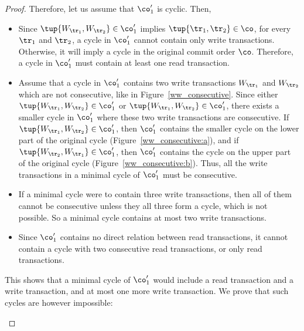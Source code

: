 \begin{proof}
Therefore, let us assume that $\co'_1$ is cyclic. Then,
 \begin{itemize}
  \item Since $\tup{W_{\tr_1}, W_{\tr_2}} \in \co'_1$ implies $\tup{\tr_1, \tr_2} \in \co$, for every $\tr_1$ and $\tr_2$, a cycle in $\co'_1$ cannot contain only write transactions. Otherwise, it will imply a cycle in the original commit order $\co$. Therefore, a cycle in $\co'_1$ must contain at least one read transaction. 
  \item Assume that a cycle in $\co'_1$ contains two write transactions $W_{\tr_1}$ and $W_{\tr_2}$ which are not consecutive, like in Figure~\ref{ww_consecutive}.
Since either $\tup{W_{\tr_1}, W_{\tr_2}}\in \co'_1$ or $\tup{W_{\tr_1}, W_{\tr_2}}\in \co'_1$, there exists a smaller cycle in $\co'_1$ where these two write transactions are consecutive. If $\tup{W_{\tr_1}, W_{\tr_2}}\in \co'_1$, then $\co'_1$ contains the smaller cycle on the lower part of the original cycle (Figure~\ref{ww_consecutive:a}), and if $\tup{W_{\tr_2}, W_{\tr_1}}\in \co'_1$, then $\co'_1$ contains the cycle on the upper part of the original cycle (Figure~\ref{ww_consecutive:b}). Thus, all the write transactions in a minimal cycle of $\co'_1$ must be consecutive. 
  \item If a minimal cycle were to contain three write transactions, then all of them cannot be consecutive unless they all three form a cycle, which is not possible. So a minimal cycle contains at most two write transactions.
  \item Since $\co'_1$ contains no direct relation between read transactions, it cannot contain a cycle with two consecutive read transactions, or only read transactions.
 \end{itemize}
This shows that a minimal cycle of $\co'_1$ would include a read transaction and a write transaction, and at most one more write transaction. We prove that such cycles are however impossible:
 \begin{itemize}

\end{itemize}
\end{proof}
